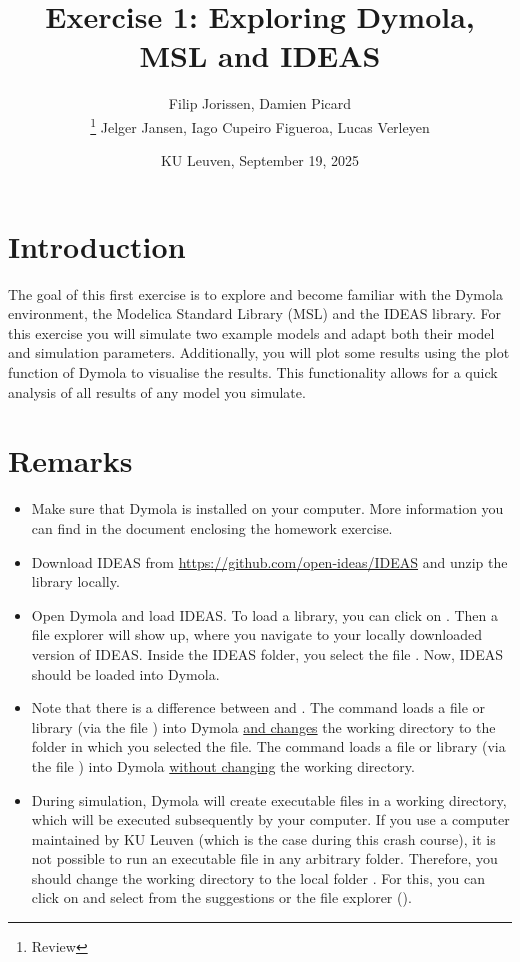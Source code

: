 \documentclass[10pt,a4paper]{article}
\begin{document}
\title{Exercise 1: Exploring Dymola, MSL and IDEAS}
\author{Filip Jorissen, Damien Picard \\  \thanks{Review} Jelger Jansen, Iago Cupeiro Figueroa, Lucas Verleyen}
\date{KU Leuven, September 19, 2025}
\maketitle

\doclicenseThis

\section*{Introduction}
The goal of this first exercise is to explore and become familiar with the Dymola environment, the Modelica Standard Library (MSL) and the IDEAS library. For this exercise you will simulate two example models and adapt both their model and simulation parameters. Additionally, you will plot some results using the plot function of Dymola to visualise the results. This functionality allows for a quick analysis of all results of any model you simulate. 

\section*{Remarks}
 
\begin{itemize}
	\item Make sure that Dymola is installed on your computer. More information you can find in the document enclosing the homework exercise.
	\item Download IDEAS from \href{https://github.com/open-ideas/IDEAS}{https://github.com/open-ideas/IDEAS} and unzip the library locally.
	\item Open Dymola and load IDEAS. To load a library, you can click on . Then a file explorer will show up, where you navigate to your locally downloaded version of IDEAS. Inside the IDEAS folder, you select the file . Now, IDEAS should be loaded into Dymola.
	\item Note that there is a difference between  and . The command  loads a file or library (via the file ) into Dymola \underline{and changes} the working directory to the folder in which you selected the file. The command  loads a file or library (via the file ) into Dymola \underline{without changing} the working directory.
	\item During simulation, Dymola will create executable files in a working directory, which will be executed subsequently by your computer. If you use a computer maintained by KU Leuven (which is the case during this crash course), it is not possible to run an executable file in any arbitrary folder. Therefore, you should change the working directory to the local folder . For this, you can click on  and select  from the suggestions or the file explorer ().
\end{itemize}
\end{document}
